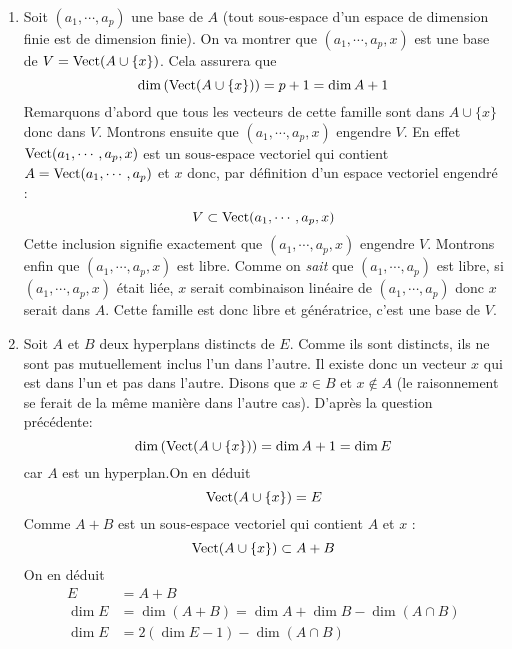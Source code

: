 \begin{enumerate}
\item Soit $(a_1,\cdots,a_p)$ une base de $A$ (tout sous-espace d'un espace de dimension finie est de dimension   finie). On va montrer que $(a_1,\cdots,a_p,x)$ est une base de $V = \operatorname{Vect}(A\cup \{x\})$. Cela assurera que
\begin{displaymath}
 \dim\left( \operatorname{Vect}(A\cup \{x\})\right)=p+1=\dim A +1 
\end{displaymath}
Remarquons d'abord que tous les vecteurs de cette famille sont dans $A\cup \{x\}$ donc dans $V$.\newline
Montrons ensuite que $(a_1,\cdots,a_p,x)$ engendre $V$. En effet $\operatorname{Vect}(a_1,\cdots,a_p,x)$ est un sous-espace vectoriel qui contient $A=\operatorname{Vect}(a_1,\cdots,a_p)$ et $x$ donc, par définition d'un espace vectoriel engendré :
\begin{displaymath}
 V \subset \operatorname{Vect}(a_1,\cdots,a_p,x)
\end{displaymath}
Cette inclusion signifie exactement que $(a_1,\cdots,a_p,x)$ engendre $V$.
Montrons enfin que $(a_1,\cdots,a_p,x)$ est libre. Comme on \emph{sait} que $(a_1,\cdots,a_p)$ est libre, si $(a_1,\cdots,a_p,x)$ était liée, $x$ serait combinaison linéaire de $(a_1,\cdots,a_p)$ donc $x$ serait dans $A$.\newline
Cette famille est donc libre et génératrice, c'est une base de $V$.
\item Soit $A$ et $B$ deux hyperplans distincts de $E$. Comme ils sont distincts, ils ne sont pas mutuellement inclus l'un dans l'autre. Il existe donc un vecteur $x$ qui est dans l'un et pas dans l'autre. Disons que $x\in B$ et $x\not\in A$ (le raisonnement se ferait de la même manière dans l'autre cas). D'après la question précédente:
\begin{displaymath}
 \dim\left( \operatorname{Vect}(A\cup \{x\})\right)=\dim A +1 =\dim E
\end{displaymath}
car $A$ est un hyperplan.On en déduit
\begin{displaymath}
 \operatorname{Vect}(A\cup \{x\}) = E
\end{displaymath}
 Comme $A+B$ est un sous-espace vectoriel qui contient $A$ et $x$ :
\begin{displaymath}
 \operatorname{Vect}(A\cup \{x\}) \subset A+B
\end{displaymath}
On en déduit
\begin{align*}
 E &= A+B \\
\dim E &= \dim (A+B) = \dim A + \dim B -\dim(A\cap B)\\
\dim E &= 2(\dim E -1) - \dim(A\cap B)\\

\end{align*}
\end{enumerate}
